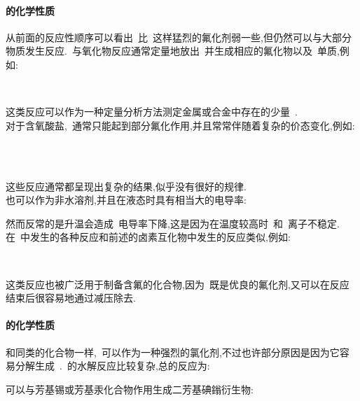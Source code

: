 \documentclass{ctexbook}
\begin{document}
\paragraph{的化学性质}
从前面的反应性顺序可以看出~比~这样猛烈的氟化剂弱一些,但仍然可以与大部分物质发生反应.~与氧化物反应通常定量地放出~并生成相应的氟化物以及~单质,例如:
\begin{tightcenter}
    \\
\end{tightcenter}
这类反应可以作为一种定量分析方法测定金属或合金中存在的少量~.\\
\indent 对于含氧酸盐,~通常只能起到部分氟化作用,并且常常伴随着复杂的价态变化,例如:
\begin{tightcenter}
    \\
    \\
\end{tightcenter}
这些反应通常都呈现出复杂的结果,似乎没有很好的规律.\\
\indent {}也可以作为非水溶剂,并且在液态时具有相当大的电导率:
\begin{tightcenter}
\end{tightcenter}
然而反常的是升温会造成~电导率下降,这是因为在温度较高时~\ce{[BrF2]+}和~\ce{[BrF4]-}离子不稳定.在~中发生的各种反应和前述的卤素互化物中发生的反应类似,例如:
\begin{tightcenter}
    \\
\end{tightcenter}
这类反应也被广泛用于制备含氟的化合物,因为~既是优良的氟化剂,又可以在反应结束后很容易地通过减压除去.
\paragraph{的化学性质}
和同类的化合物一样,~可以作为一种强烈的氯化剂,不过也许部分原因是因为它容易分解生成~.~的水解反应比较复杂,总的反应为:
\begin{tightcenter}
\end{tightcenter}
可以与芳基锡或芳基汞化合物作用生成二芳基碘鎓衍生物:
\begin{tightcenter}
\end{tightcenter}
\end{document}
